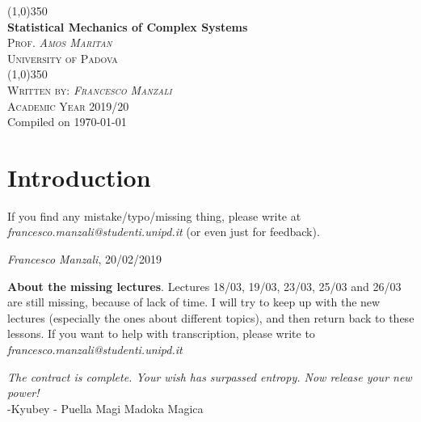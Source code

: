 \documentclass[12pt,a4paper]{report} %
\begin{document}
\begin{center}
                \line (1,0){350} \\
                \huge{\bfseries Statistical Mechanics of Complex Systems}\\
                [2mm]
                \textsc{\normalsize Prof. \textit{Amos Maritan}}
                \vspace{-0.5em}\\
                \textsc{\normalsize University of Padova}\\
                \vspace{-1em}
                \line (1,0){350} \\
        [0.2cm]
        \textsc{\normalsize Written by: \textit{Francesco Manzali}}\\
                \textsc{\normalsize Academic Year 2019/20}\\ 
        {\scriptsize Compiled on \today}\\
        [0.2cm]
        {\scriptsize \doclicenseLongText}
\end{center}


\tableofcontents 
\clearpage
\section*{Introduction}
If you find any mistake/typo/missing thing, please write at \textit{francesco.manzali@studenti.unipd.it} (or even just for feedback).

\begin{flushright}
\textit{Francesco Manzali}, 20/02/2019
\end{flushright}


\begin{appr}
\textbf{About the missing lectures}. Lectures 18/03, 19/03, 23/03, 25/03 and 26/03 are still missing, because of lack of time. I will try to keep up with the new lectures (especially the ones about different topics), and then return back to these lessons. If you want to help with transcription, please write to \textit{francesco.manzali@studenti.unipd.it}
\end{appr}

\begin{flushright}
\textit{The contract is complete. Your wish has surpassed entropy. Now release your new power!}\\
-Kyubey - Puella Magi Madoka Magica
\end{flushright}
\end{document}
